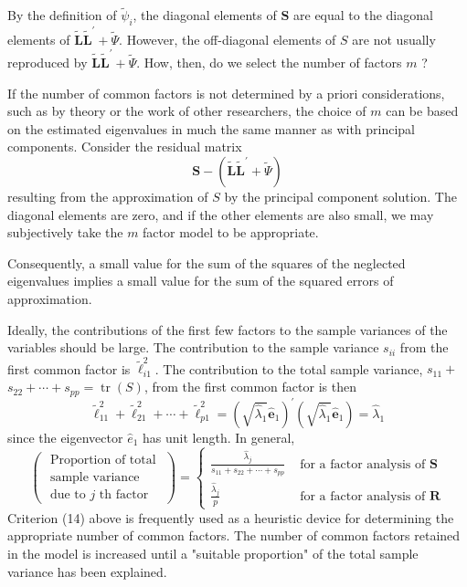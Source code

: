 \documentclass[12pt]{article}
\numberwithin{equation}{section}
\begin{document}
\noindent By the definition of $\widetilde{\psi}_i$, the diagonal elements of $\mathbf{S}$ are equal to the diagonal elements of $\widetilde{\mathbf{L}} \widetilde{\mathbf{L}}^{\prime}+\widetilde{\Psi}$. However, the off-diagonal elements of $S$ are not usually reproduced by $\widetilde{\mathbf{L}} \widetilde{\mathbf{L}}^{\prime}+\widetilde{\Psi}$. How, then, do we select the number of factors $m$ ?

\noindent If the number of common factors is not determined by a priori considerations, such as by theory or the work of other researchers, the choice of $m$ can be based on the estimated eigenvalues in much the same manner as with principal components. Consider the residual matrix
$$
\mathbf{S}-\left(\widetilde{\mathbf{L}} \tilde{\mathbf{L}}^{\prime}+\widetilde{\Psi}\right)
$$
resulting from the approximation of $S$ by the principal component solution. The diagonal elements are zero, and if the other elements are also small, we may subjectively take the $m$ factor model to be appropriate.

\noindent Consequently, a small value for the sum of the squares of the neglected eigenvalues implies a small value for the sum of the squared errors of approximation.

\noindent Ideally, the contributions of the first few factors to the sample variances of the variables should be large. The contribution to the sample variance $s_{i i}$ from the first common factor is $\widetilde{\ell}_{i 1}^2$. The contribution to the total sample variance, $s_{11}+$ $s_{22}+\cdots+s_{p p}=\operatorname{tr}(S)$, from the first common factor is then
$$
\tilde{\ell}_{11}^2+\tilde{\ell}_{21}^2+\cdots+\tilde{\ell}_{p 1}^2=\left(\sqrt{\hat{\lambda}_1} \hat{\mathbf{e}}_1\right)^{\prime}\left(\sqrt{\hat{\lambda}_1} \hat{\mathbf{e}}_1\right)=\hat{\lambda}_1
$$
since the eigenvector $\hat{e}_1$ has unit length. In general,
\begin{equation}
	\left(\begin{array}{c}
		\text { Proportion of total } \\
		\text { sample variance } \\
		\text { due to } j \text { th factor }
	\end{array}\right)=\left\{\begin{array}{cl}
		\frac{\hat{\lambda}_j}{s_{11}+s_{22}+\cdots+s_{p p}} & \text { for a factor analysis of } \mathbf{S} \\
		\frac{\hat{\lambda}_j}{p} & \text { for a factor analysis of } \mathbf{R}
	\end{array}\right.
\end{equation}
Criterion (14) above is frequently used as a heuristic device for determining the appropriate number of common factors. The number of common factors retained in the model is increased until a "suitable proportion" of the total sample variance has been explained.
\end{document}

